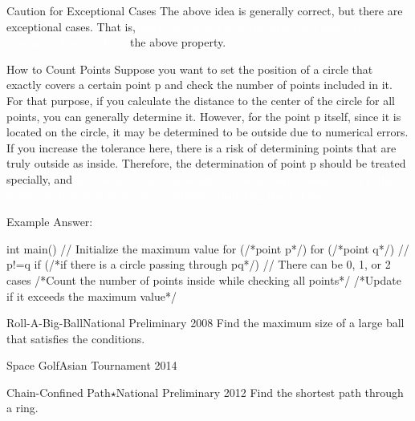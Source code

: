 \begin{debugbox}{Caution for Exceptional Cases}
The above idea is generally correct, but there are exceptional cases. That is, \textcolor{white}{when the answer is 1, the circle that gives the maximum does not have} the above property.
\end{debugbox}

\begin{debugbox}{How to Count Points}
  Suppose you want to set the position of a circle that exactly covers a certain point p and check the number of points included in it. For that purpose, if you calculate the distance to the center of the circle for all points, you can generally determine it. However, for the point p itself, since it is located on the circle, it may be determined to be outside due to numerical errors. If you increase the tolerance here, there is a risk of determining points that are truly outside as inside. Therefore, the determination of point p should be treated specially, and \textcolor{white}{it is better to use the identity of the id (what number it is if the points are managed in an array) without calculating the distance.}
\end{debugbox}

Example Answer:

\begin{cbox}
int main() {
  // Initialize the maximum value
  for (/*point p*/) {
    for (/*point q*/) { // p!=q
      if (/*if there is a circle passing through pq*/) { // There can be 0, 1, or 2 cases
         /*Count the number of points inside while checking all points*/
         /*Update if it exceeds the maximum value*/
      }
    }
  }
}
\end{cbox}


\begin{pbox}{Roll-A-Big-Ball}{National Preliminary 2008}
Find the maximum size of a large ball that satisfies the conditions.

\end{pbox}

\begin{pbox}{Space Golf}{Asian Tournament 2014}
  
\end{pbox}

\begin{pbox}{Chain-Confined Path$\star$}{National Preliminary 2012}
  Find the shortest path through a ring.

\end{pbox}

